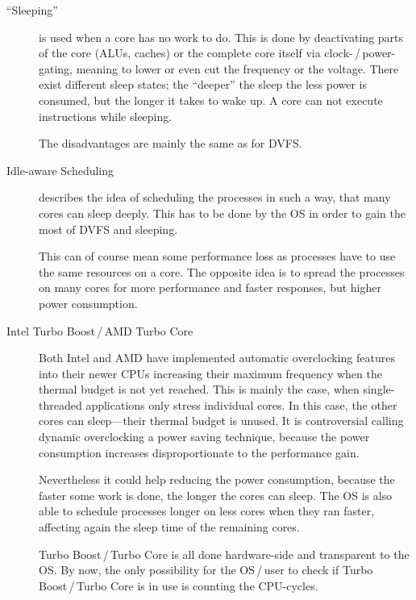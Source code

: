 \begin{description}
\item[``Sleeping''] is used when a core has no work to do. This is done by deactivating parts of the core (ALUs, caches) or the complete core itself via clock-\,/\,power-gating, meaning to lower or even cut the frequency or the voltage. There exist different sleep states; the ``deeper'' the sleep the less power is consumed, but the longer it takes to wake up. A core can not execute instructions while sleeping.
\label{item:sleeping}

The disadvantages are mainly the same as for DVFS\cite{anand}.

\item[Idle-aware Scheduling] describes the idea of scheduling the processes in such a way, that many cores can sleep deeply.
This has to be done by the OS in order to gain the most of DVFS and sleeping.

This can of course mean some performance loss as processes have to use the same resources on a core. The opposite idea is to spread the processes on many cores for more performance and faster responses, but higher power consumption\cite{scheduler}.

\item[Intel Turbo Boost\,/\,AMD Turbo Core] Both Intel and AMD have implemented automatic overclocking features into their newer CPUs increasing their maximum frequency when the thermal budget is not yet reached. This is mainly the case, when single-threaded applications only stress individual cores. In this case, the other cores can sleep---their thermal budget is unused.
It is controversial calling dynamic overclocking a power saving technique, because the power consumption increases disproportionate to the performance gain.

Nevertheless it could help reducing the power consumption, because the faster some work is done, the longer the cores can sleep. The OS is also able to schedule processes longer on less cores when they ran faster, affecting again the sleep time of the remaining cores.

Turbo Boost\,/\,Turbo Core is all done hardware-side and transparent to the OS. By now, the only possibility for the OS\,/\,user to check if Turbo Boost\,/\,Turbo Core is in use is counting the CPU-cycles\cite{turboboost}.
\end{description}